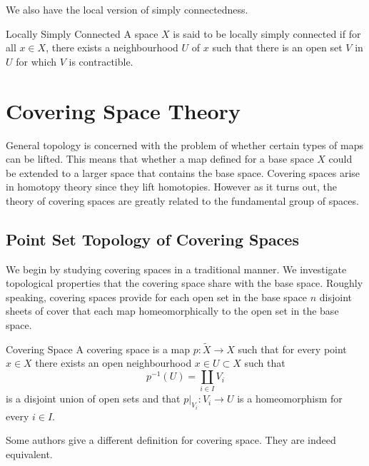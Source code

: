 \documentclass[a4paper]{article}
\begin{document}
We also have the local version of simply connectedness. 

\begin{defn}{Locally Simply Connected}{} A space $X$ is said to be locally simply connected if for all $x\in X$, there exists a neighbourhood $U$ of $x$ such that there is an open set $V$ in $U$ for which $V$ is contractible. 
\end{defn}

\pagebreak
\section{Covering Space Theory}
General topology is concerned with the problem of whether certain types of maps can be lifted. This means that whether a map defined for a base space $X$ could be extended to a larger space that contains the base space. Covering spaces arise in homotopy theory since they lift homotopies. However as it turns out, the theory of covering spaces are greatly related to the fundamental group of spaces. 

\subsection{Point Set Topology of Covering Spaces}
We begin by studying covering spaces in a traditional manner. We investigate topological properties that the covering space share with the base space. Roughly speaking, covering spaces provide for each open set in the base space $n$ disjoint sheets of cover that each map homeomorphically to the open set in the base space. 

\begin{defn}{Covering Space}{} A covering space is a map $p:\widetilde{X}\to X$ such that for every point $x\in X$ there exists an open neighbourhood $x\in U\subset X$ such that $$p^{-1}(U)=\coprod_{i\in I}V_i$$ is a disjoint union of open sets and that $p|_{V_i}:V_i\to U$ is a homeomorphism for every $i\in I$. 
\end{defn}

Some authors give a different definition for covering space. They are indeed equivalent. 
\end{document}
